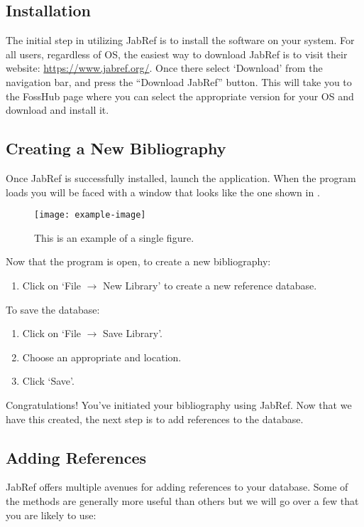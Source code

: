		\subsection{Installation}
			The initial step in utilizing JabRef is to install the software on your system. 
			For all users, regardless of OS, the easiest way to download JabRef is to visit their website: \url{https://www.jabref.org/}.
			Once there select `Download' from the navigation bar, and press the ``Download JabRef'' button. 
			This will take you to the FossHub page where you can select the appropriate version for your OS and download and install it.

		\subsection{Creating a New Bibliography}
			Once JabRef is successfully installed, launch the application. 
			When the program loads you will be faced with a window that looks like the one shown in .
			
			\begin{figure}[htbp]
				\centering
				\texttt{[image: example-image]}
				\caption{This is an example of a single figure.}
				\label{fig:JabRefProgram}
			\end{figure}
			
			Now that the program is open, to create a new bibliography:
			\begin{enumerate}
				\item Click on `File $\rightarrow$ New Library' to create a new reference database.
			\end{enumerate}
			To save the database:
			\begin{enumerate}
				\item Click on `File $\rightarrow$ Save Library'.
				\item Choose an appropriate and location.
				\item Click `Save'.
			\end{enumerate}
			Congratulations! You've initiated your bibliography using JabRef. 
			Now that we have this created, the next step is to add references to the database.

		\subsection{Adding References}
			JabRef offers multiple avenues for adding references to your database.
			Some of the methods are generally more useful than others but we will go over a few that you are likely to use:

